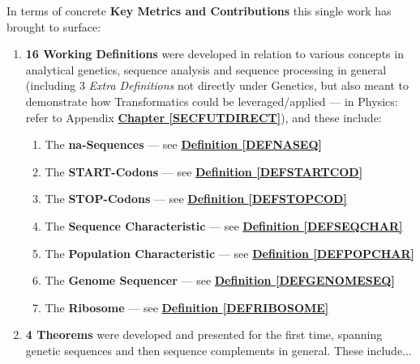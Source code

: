 \documentclass[a4paper, 18pt]{book} %
\begin{document}
In terms of concrete \textbf{Key Metrics and Contributions} this single work has brought to surface:
\begin{enumerate}
\item{ \textbf{16 Working Definitions} were developed in relation to various concepts in analytical genetics, sequence analysis and sequence processing in general (including 3 \textit{Extra Definitions} not directly under Genetics, but also meant to demonstrate how Transformatics could be leveraged/applied --- in Physics: refer to Appendix  \textbf{\hyperref[SECFUTDIRECT]{Chapter \ref{SECFUTDIRECT}}}), and these include:

	\begin{enumerate}
	\item The \textbf{na-Sequences} --- see  \textbf{\hyperref[DEFNASEQ]{Definition \ref{DEFNASEQ}}}
	\item The \textbf{START-Codons} --- see \textbf{\hyperref[DEFSTARTCOD]{Definition \ref{DEFSTARTCOD}}}
		\item The \textbf{STOP-Codons} --- see \textbf{\hyperref[DEFSTOPCOD]{Definition \ref{DEFSTOPCOD}}}
	\item The \textbf{Sequence Characteristic} --- see  \textbf{\hyperref[DEFSEQCHAR]{Definition \ref{DEFSEQCHAR}}}
	\item The \textbf{Population Characteristic} --- see  \textbf{\hyperref[DEFPOPCHAR]{Definition \ref{DEFPOPCHAR}}}
	\item The \textbf{Genome Sequencer} --- see  \textbf{\hyperref[DEFGENOMESEQ]{Definition \ref{DEFGENOMESEQ}}}
	\item The \textbf{Ribosome} --- see  \textbf{\hyperref[DEFRIBOSOME]{Definition \ref{DEFRIBOSOME}}}
	\end{enumerate}

}
\item{ \textbf{4 Theorems} were developed and presented for the first time, spanning genetic sequences and then sequence complements in general. These include...

}
\end{enumerate}
\end{document}
